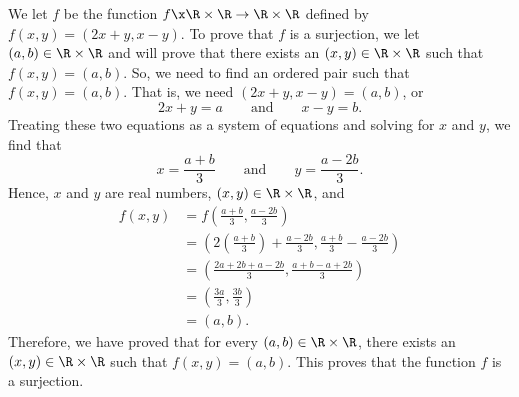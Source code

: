 \begin{enumerate}
\begin{enumerate}
\begin{myproof}
We let $f$ be the function $f\x\R \times \R \to \R \times \R$ defined by  
$f( {x, y} ) = ( {2x + y, x - y} )$.  To prove that $f$ is a surjection, we let 
$(a, b) \in \R \times \R$ and will prove that there exists an $(x, y) \in \R \times \R$ such that $f(x, y) = (a, b)$.  So, we need to find an ordered pair such that $f(x, y) = (a, b)$. That is, we need $(2x + y, x - y) = (a, b)$, or
\[
2x + y = a \qquad \text{and} \qquad x - y = b.
\]
Treating these two equations as a system of equations and solving for $x$ and $y$, we find that
\[
x = \frac{a + b}{3} \qquad \text{and} \qquad y = \frac{a - 2b}{3}.
\]
Hence, $x$ and $y$ are real numbers, $(x, y) \in \R \times \R$, and
\begin{align*}
f(x, y) &= f \left( \frac{a + b}{3}, \frac{a - 2b}{3} \right) \\
        &= \left(2 \left( \frac{a + b}{3} \right) + \frac{a - 2b}{3}, \frac{a + b}{3} - \frac{a - 2b}{3} \right) \\
        &= \left( \frac{2a + 2b + a - 2b}{3}, \frac{a + b - a + 2b}{3} \right) \\
        &= \left( \frac{3a}{3}, \frac{3b}{3} \right) \\
        &= (a, b).
\end{align*}
Therefore, we have proved that for every $(a, b) \in \R \times \R$, there exists an 
$(x, y) \in \R \times \R$ such that $f(x, y) = (a, b)$.  This proves that the function $f$ is a surjection.
\end{myproof}
\end{enumerate}
\end{enumerate}




